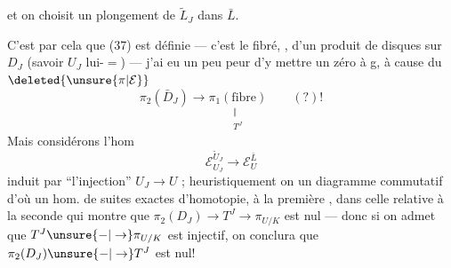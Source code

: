 
et on choisit un plongement de $\tilde L_J$ dans $\bar L$.

C'est par cela que (37) est définie --- c'est le  fibré, , d'un produit de disques sur $D_J$ (savoir $U_J$ lui-$=$) --- j'ai eu un peu peur d'y mettre un zéro à g, à cause du $\deleted{\unsure{\pi|\mathcal E}}$
\[
\pi_2(\bar D_J)\longrightarrow
\underset{\substack{\Vert\\ T^J}}{\pi_1(\text{fibre})}
\qquad (?)!
\]
Mais considérons l'hom
\[
\mathcal E_{U_J}^{\tilde U_J}\longrightarrow\mathcal E_U^{\bar L}
\]
induit par ``l'injection'' $U_J\longrightarrow U$ ;  heuristiquement on  un diagramme  commutatif
d'où un hom. de suites exactes d'homotopie,  à la première , dans celle relative à la seconde
qui montre que  $\pi_2(D_J)\longrightarrow T^J\longrightarrow\pi_{U/K}$ est nul --- donc si on admet que $T^J\unsure{-|\to}\pi_{U/K}$ est injectif, on conclura que $\pi_2(D_J)\unsure{-|\to}T^J$ est nul!

